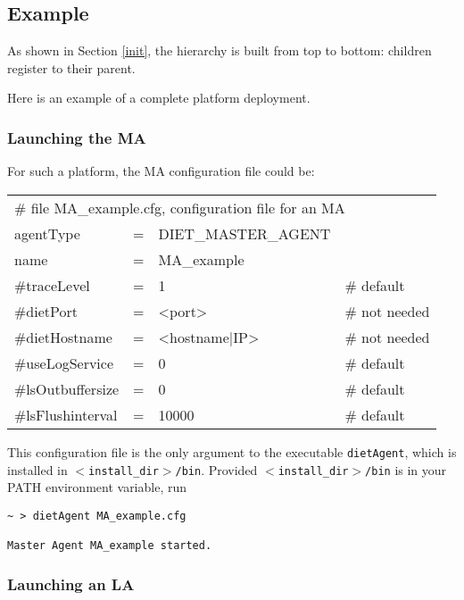 \subsection{Example}
\label{sec:deploy_ex}

As shown in Section \ref{init}, the hierarchy is built from top to bottom:
children register to their parent.

Here is an example of a complete platform deployment.
\subsubsection{Launching the MA}

For such a platform, the MA configuration file could be:
\tt
\begin{center}
 \footnotesize
 \begin{tabular}{lcll}
  \multicolumn{4}{l}{\# file MA\_example.cfg, configuration file for an MA}\\
  agentType     &=&DIET\_MASTER\_AGENT&\\
  name          &=&MA\_example        &\\
  \#traceLevel  &=&1                  &\# default\\
  \#dietPort    &=&<port>             &\# not needed\\
  \#dietHostname&=&<hostname|IP>      &\# not needed\\
  \#useLogService &=& 0               &\# default\\
  \#lsOutbuffersize &=& 0             &\# default\\
  \#lsFlushinterval &=& 10000           &\# default\\
 \end{tabular}
\end{center}
\rm

This configuration file is the only argument to the executable
\texttt{dietAgent}, which is installed in
\texttt{$<$install\_dir$>$/bin}. Provided
\texttt{$<$install\_dir$>$/bin} is in your PATH environment variable, run
{\footnotesize
\begin{verbatim}
~ > dietAgent MA_example.cfg

Master Agent MA_example started.
\end{verbatim}
}


\subsubsection{Launching an LA}

